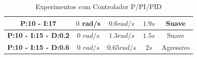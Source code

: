 \begin{table}[!htb]
\begin{tabular}{|c|c|c|c|c|}
		\textbf{P:10 - I:17}                                                                      & $0$ rad/s                                                               & $0.6 rad/s$                                                            & $1.9s$                                                                    & Suave             \\ \hline
		\textbf{P:10 - I:15 - D:0.2}                                                              & $0$ $rad/s$                                                               & $1.3 rad/s$                                                            & $1.5s$                                                                    & Suave             \\ \hline
		\textbf{P:10 - I:15 - D:0.6}                                                              & $0$ $rad/s$                                                               & $0.65 rad/s$                                                           & $2s$                                                                      & Agressivo         \\ \hline
	\end{tabular}
	\caption{Experimentos com Controlador P/PI/PID}
	\label{t:cpid}
\end{table}


